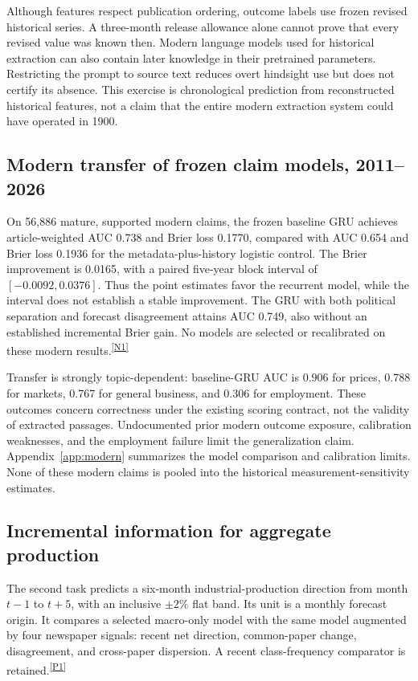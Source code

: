 \documentclass[iicol,pdflatex,sn-mathphys-num]{sn-jnl}
\newcommand{\evidence}[1]{\textsuperscript{\hyperref[app:evidence]{[#1]}}}
\begin{document}
Although features respect publication ordering, outcome labels use frozen revised historical series. A three-month release allowance alone cannot prove that every revised value was known then. Modern language models used for historical extraction can also contain later knowledge in their pretrained parameters. Restricting the prompt to source text reduces overt hindsight use but does not certify its absence. This exercise is chronological prediction from reconstructed historical features, not a claim that the entire modern extraction system could have operated in 1900.

\subsection{Modern transfer of frozen claim models, 2011--2026}
On 56,886 mature, supported modern claims, the frozen baseline GRU achieves article-weighted AUC 0.738 and Brier loss 0.1770, compared with AUC 0.654 and Brier loss 0.1936 for the metadata-plus-history logistic control. The Brier improvement is 0.0165, with a paired five-year block interval of $[-0.0092,0.0376]$. Thus the point estimates favor the recurrent model, while the interval does not establish a stable improvement. The GRU with both political separation and forecast disagreement attains AUC 0.749, also without an established incremental Brier gain. No models are selected or recalibrated on these modern results.\evidence{N1}

Transfer is strongly topic-dependent: baseline-GRU AUC is 0.906 for prices, 0.788 for markets, 0.767 for general business, and 0.306 for employment. These outcomes concern correctness under the existing scoring contract, not the validity of extracted passages. Undocumented prior modern outcome exposure, calibration weaknesses, and the employment failure limit the generalization claim. Appendix~\ref{app:modern} summarizes the model comparison and calibration limits. None of these modern claims is pooled into the historical measurement-sensitivity estimates.

\subsection{Incremental information for aggregate production}
The second task predicts a six-month industrial-production direction from month $t-1$ to $t+5$, with an inclusive $\pm2\%$ flat band. Its unit is a monthly forecast origin. It compares a selected macro-only model with the same model augmented by four newspaper signals: recent net direction, common-paper change, disagreement, and cross-paper dispersion. A recent class-frequency comparator is retained.\evidence{P1}
\end{document}

